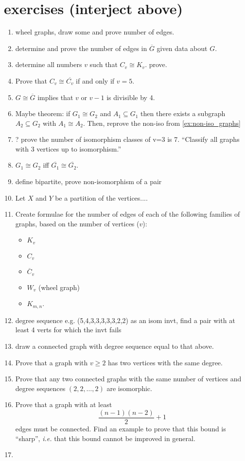 \section*{exercises (interject above)}
\begin{enumerate}
    \item wheel graphs, draw some and prove number of edges.
    \item determine and prove the number of edges in $\overline{G}$ given data about $G$.
    \item determine all numbers $v$ such that $C_v \cong K_v$. prove.
    \item Prove that $C_v \cong \overline{C_v}$ if and only if $v = 5$.
    \item $G \cong \overline{G}$ implies that $v$ or $v-1$ is divisible by 4.
    \item Maybe theorem: if $G_1 \cong G_2$ and $A_1 \subseteq G_1$ then there exists a subgraph $A_2 \subseteq G_2$ with $A_1 \cong A_2$.  Then, reprove the non-iso from \ref{ex:non-iso_graphs}
    \item ? prove the number of isomorphism classes of v=3 is 7.  ``Classify all graphs with 3 vertices up to isomorphism.''
    \item $G_1 \cong G_2$ iff $\overline{G_1} \cong \overline{G_2}$.
    \item define bipartite, prove non-isomorphism of a pair
        \item Let $X$ and $Y$ be a partition of the vertices....
    \item Create formulae for the number of edges of each of the following families of graphs, based on the number of vertices ($v$):
    \begin{itemize}
        \item $K_v$
        \item $C_v$
        \item $\overline{C}_v$
        \item $W_v$ (wheel graph)
        \item $K_{m,n}$.
    \end{itemize}

    \item degree sequence e.g. (5,4,3,3,3,3,3,2,2) as an isom invt, find a pair with at least 4 verts for which the invt fails
    \item draw a connected graph with degree sequence equal to that above.
    \item Prove that a graph with $v \geq 2$ has two vertices with the same degree.
    \item Prove that any two connected graphs with the same number of vertices and degree sequences $(2, 2, \ldots, 2)$ are isomorphic.
    \item Prove that a graph with at least
    $$\frac{(n-1)(n-2)}{2} +1$$
    edges must be connected.  Find an example to prove that this bound is ``sharp'', \textit{i.e.} that this bound cannot be improved in general.
    \item

\end{enumerate}
